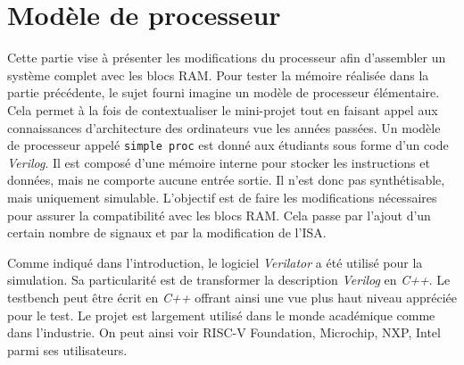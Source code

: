 \section{Modèle de processeur}

Cette partie vise à présenter les modifications du processeur afin d'assembler un système complet avec les blocs \gls{RAM}.
Pour tester la mémoire réalisée dans la partie précédente, le sujet fourni imagine un modèle de processeur élémentaire.
Cela permet à la fois de contextualiser le mini-projet tout en faisant appel aux connaissances d'architecture des ordinateurs vue les années passées.
Un modèle de processeur appelé \texttt{simple proc} est donné aux étudiants sous forme d'un code \textit{Verilog}.
Il est composé d'une mémoire interne pour stocker les instructions et données, mais ne comporte aucune entrée sortie.
Il n'est donc pas synthétisable, mais uniquement simulable.
L'objectif est de faire les modifications nécessaires pour assurer la compatibilité avec les blocs \gls{RAM}.
Cela passe par l'ajout d'un certain nombre de signaux et par la modification de l'\gls{ISA}. \\
\gap

Comme indiqué dans l'introduction, le logiciel \textit{Verilator} a été utilisé pour la simulation.
Sa particularité est de transformer la description \textit{Verilog} en \textit{C++}.
Le testbench peut être écrit en \textit{C++} offrant ainsi une vue plus haut niveau appréciée pour le test.
Le projet est largement utilisé dans le monde académique comme dans l'industrie.
On peut ainsi voir RISC-V Foundation, Microchip, NXP, Intel parmi ses utilisateurs.


